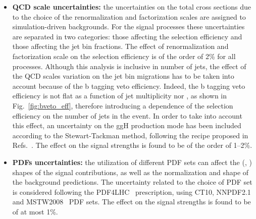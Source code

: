 \begin{itemize}

\item {\bf QCD scale uncertainties:}
the uncertainties on the total cross sections due to the choice of the renormalization and factorization scales are assigned to simulation-driven backgrounds. For the signal processes these uncertainties are separated in two categories: those affecting the selection efficiency and those affecting the jet bin fractions. The effect of renormalization and factorization scale on the selection efficiency is of the order of 2\% for all processes. Although this analysis is inclusive in number of jets, the effect of the QCD scales variation on the jet bin migrations has to be taken into account because of the b tagging veto efficiency. Indeed, the b tagging veto efficiency is not flat as a function of jet multiplicity nor \pth, as shown in Fig.~\ref{fig:bveto_eff}, therefore introducing a dependence of the selection efficiency on the number of jets in the event.
In order to take into account this effect, an uncertainty on the ggH production mode has been included according to the Stewart-Tackman method, following the recipe proposed in Refs.~\cite{Stewart:2011cf,Heinemeyer:2013tqa}. The effect on the signal strengths is found to be of the order of 1--2\%.

\item {\bf PDFs uncertainties:} 
the utilization of different PDF sets can affect the (\mll, \mt) shapes of the signal contributions, as well as the normalization and shape of the background predictions. The uncertainty related to the choice of PDF set is considered following the PDF4LHC~\cite{Alekhin:2011sk,Botje:2011sn} prescription, using CT10, NNPDF2.1~\cite{Ball:2011mu} and MSTW2008~\cite{Martin:2009iq} PDF sets. The effect on the signal strengths is found to be of at most 1\%.
\end{itemize}

